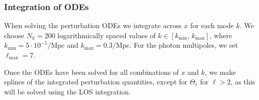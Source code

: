 \subsubsection{Integration of ODEs} \label{sssec:M3:implementations:integration_of_ODEs}

When solving the perturbation ODEs we integrate across $x$ for each mode $k$. We choose $N_k=200$ logarithmically spaced values of $k\in[k_\mathrm{min},\,k_\mathrm{max}]$, where $k_\mathrm{min}=5\cdot10^{-5}/\mathrm{Mpc}$ and $k_\mathrm{max}=0.3/\mathrm{Mpc}$. For the photon multipoles, we set $\ell_\mathrm{max}=7$.

Once the ODEs have been solved for all combinations of $x$ and $k$, we make splines of the integrated perturbation quantities, except for $\Theta_\ell$ for $\ell>2$, as this will be solved using the LOS integration. 